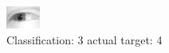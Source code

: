 \begin{figure}[h!]
\begin{center}
\includegraphics[width=0.60\columnwidth]{figures/ID2436_class_3_target_4.png}
\end{center}
\caption{ Classification: 3 actual target: 4}
\label{fig:ID2436_class_3_target_4}
\end{figure}
